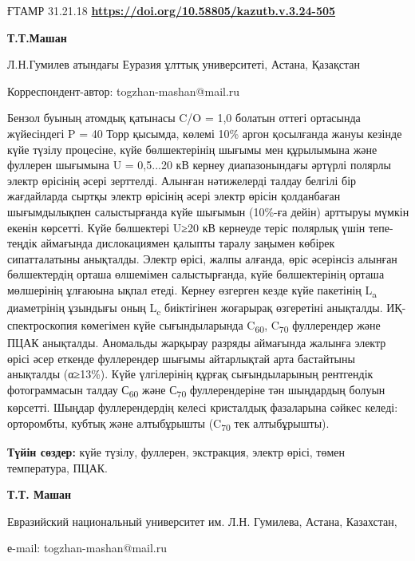 \newpage
ҒТАМР 31.21.18
\hfill {\bfseries \href{https://doi.org/10.58805/kazutb.v.3.24-505}{https://doi.org/10.58805/kazutb.v.3.24-505}}


\begin{center}
{\bfseries Т.Т.Машан}

Л.Н.Гумилев атындағы Еуразия ұлттық университеті, Астана, Қазақстан
\end{center}
\envelope Корреспондент-автор: togzhan-mashan@mail.ru


Бензол буының атомдық қатынасы C/O = 1,0 болатын оттегі ортасында
жүйесіндегі P = 40 Торр қысымда, көлемі 10\% аргон қосылғанда жануы
кезінде күйе түзілу процесіне, күйе бөлшектерінің шығымы мен құрылымына
және фуллерен шығымына U = 0,5...20 кВ кернеу диапазонындағы әртүрлі
полярлы электр өрісінің әсері зерттелді. Алынған нәтижелерді талдау
белгілі бір жағдайларда сыртқы электр өрісінің әсері электр өрісін
қолданбаған шығымдылықпен салыстырғанда күйе шығымын (10\%-ға дейін)
арттыруы мүмкін екенін көрсетті. Күйе бөлшектері U≥20 кВ кернеуде теріс
полярлық үшін тепе-теңдік аймағында дислокациямен қалыпты таралу заңымен
көбірек сипатталатыны анықталды. Электр өрісі, жалпы алғанда, өріс
әсерінсіз алынған бөлшектердің орташа өлшемімен салыстырғанда, күйе
бөлшектерінің орташа мөлшерінің ұлғаюына ықпал етеді. Кернеу өзгерген
кезде күйе пакетінің L\textsubscript{a} диаметрінің ұзындығы оның
L\textsubscript{c} биіктігінен жоғарырақ өзгеретіні анықталды.
ИҚ-спектроскопия көмегімен күйе сығындыларында C\textsubscript{60},
C\textsubscript{70} фуллерендер және ПЦАК анықталды. Аномальды жарқырау
разряды аймағында жалынға электр өрісі әсер еткенде фуллерендер шығымы
айтарлықтай арта бастайтыны анықталды (α≥13\%). Күйе үлгілерінің құрғақ
сығындыларының рентгендік фотограммасын талдау С\textsubscript{60} және
С\textsubscript{70} фуллерендеріне тән шыңдардың болуын көрсетті. Шыңдар
фуллерендердің келесі кристалдық фазаларына сәйкес келеді: орторомбты,
кубтық және алтыбұрышты (C\textsubscript{70} тек алтыбұрышты).

{\bfseries Түйін сөздер:} күйе түзілу, фуллерен, экстракция, электр өрісі,
төмен температура, ПЦАК.


\begin{center}
{\bfseries Т.Т. Машан}

Евразийский национальный университет им. Л.Н. Гумилева, Астана,
Казахстан,

е-mail: togzhan-mashan@mail.ru
\end{center}


